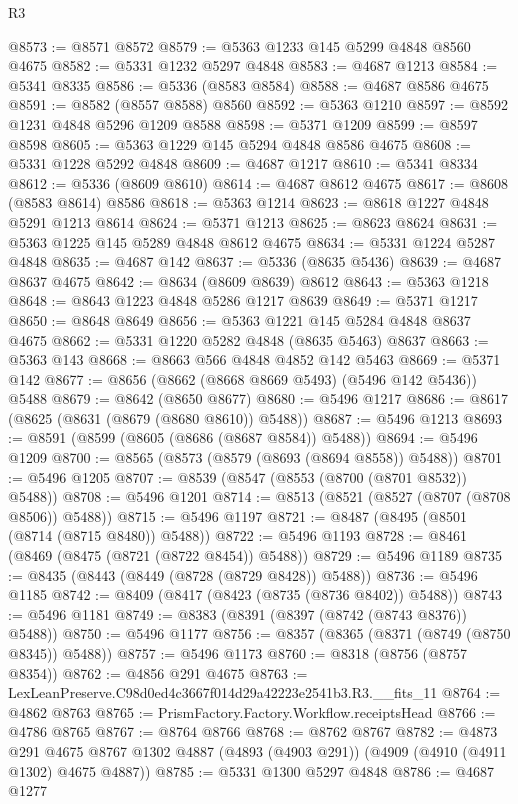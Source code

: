 \begin{lexlean}{R3}
\begin{coremodule}
@8573 := @8571 @8572
@8579 := @5363 @1233 @145 @5299 @4848 @8560 @4675
@8582 := @5331 @1232 @5297 @4848
@8583 := @4687 @1213
@8584 := @5341 @8335
@8586 := @5336 (@8583 @8584)
@8588 := @4687 @8586 @4675
@8591 := @8582 (@8557 @8588) @8560
@8592 := @5363 @1210
@8597 := @8592 @1231 @4848 @5296 @1209 @8588
@8598 := @5371 @1209
@8599 := @8597 @8598
@8605 := @5363 @1229 @145 @5294 @4848 @8586 @4675
@8608 := @5331 @1228 @5292 @4848
@8609 := @4687 @1217
@8610 := @5341 @8334
@8612 := @5336 (@8609 @8610)
@8614 := @4687 @8612 @4675
@8617 := @8608 (@8583 @8614) @8586
@8618 := @5363 @1214
@8623 := @8618 @1227 @4848 @5291 @1213 @8614
@8624 := @5371 @1213
@8625 := @8623 @8624
@8631 := @5363 @1225 @145 @5289 @4848 @8612 @4675
@8634 := @5331 @1224 @5287 @4848
@8635 := @4687 @142
@8637 := @5336 (@8635 @5436)
@8639 := @4687 @8637 @4675
@8642 := @8634 (@8609 @8639) @8612
@8643 := @5363 @1218
@8648 := @8643 @1223 @4848 @5286 @1217 @8639
@8649 := @5371 @1217
@8650 := @8648 @8649
@8656 := @5363 @1221 @145 @5284 @4848 @8637 @4675
@8662 := @5331 @1220 @5282 @4848 (@8635 @5463) @8637
@8663 := @5363 @143
@8668 := @8663 @566 @4848 @4852 @142 @5463
@8669 := @5371 @142
@8677 := @8656 (@8662 (@8668 @8669 @5493) (@5496 @142 @5436)) @5488
@8679 := @8642 (@8650 @8677)
@8680 := @5496 @1217
@8686 := @8617 (@8625 (@8631 (@8679 (@8680 @8610)) @5488))
@8687 := @5496 @1213
@8693 := @8591 (@8599 (@8605 (@8686 (@8687 @8584)) @5488))
@8694 := @5496 @1209
@8700 := @8565 (@8573 (@8579 (@8693 (@8694 @8558)) @5488))
@8701 := @5496 @1205
@8707 := @8539 (@8547 (@8553 (@8700 (@8701 @8532)) @5488))
@8708 := @5496 @1201
@8714 := @8513 (@8521 (@8527 (@8707 (@8708 @8506)) @5488))
@8715 := @5496 @1197
@8721 := @8487 (@8495 (@8501 (@8714 (@8715 @8480)) @5488))
@8722 := @5496 @1193
@8728 := @8461 (@8469 (@8475 (@8721 (@8722 @8454)) @5488))
@8729 := @5496 @1189
@8735 := @8435 (@8443 (@8449 (@8728 (@8729 @8428)) @5488))
@8736 := @5496 @1185
@8742 := @8409 (@8417 (@8423 (@8735 (@8736 @8402)) @5488))
@8743 := @5496 @1181
@8749 := @8383 (@8391 (@8397 (@8742 (@8743 @8376)) @5488))
@8750 := @5496 @1177
@8756 := @8357 (@8365 (@8371 (@8749 (@8750 @8345)) @5488))
@8757 := @5496 @1173
@8760 := @8318 (@8756 (@8757 @8354))
@8762 := @4856 @291 @4675
@8763 := LexLeanPreserve.C98d0ed4c3667f014d29a42223e2541b3.R3.__fits_11
@8764 := @4862 @8763
@8765 := PrismFactory.Factory.Workflow.receiptsHead
@8766 := @4786 @8765
@8767 := @8764 @8766
@8768 := @8762 @8767
@8782 := @4873
    @291
    @4675
    @8767
    @1302
    @4887
    (@4893 (@4903 @291))
    (@4909 (@4910 (@4911 @1302) @4675 @4887))
@8785 := @5331 @1300 @5297 @4848
@8786 := @4687 @1277

\end{coremodule}
\end{lexlean}
